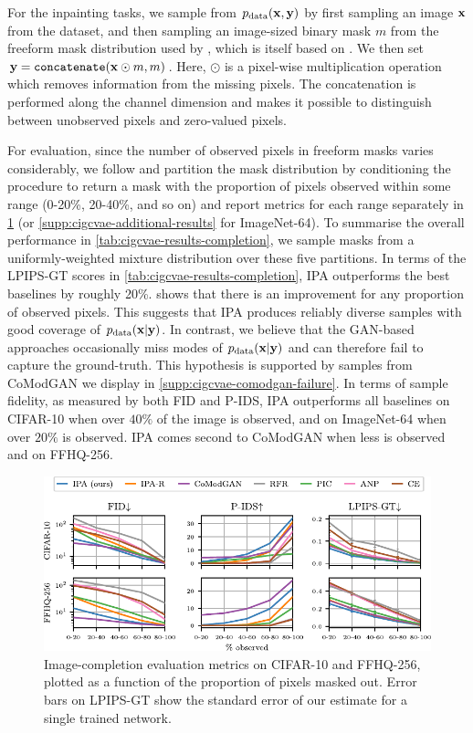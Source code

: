 For the inpainting tasks, we sample from $p_{\rm{data}}({\mathbf{x}}, {\mathbf{y}})$ by
first sampling an image ${\mathbf{x}}$ from the dataset, and then sampling an
image-sized binary mask $m$ from the freeform mask distribution used by
\citet{zhao2021large}, which is itself based on \citet{yu2018generative}. We
then set ${\mathbf{y}} = \texttt{concatenate}({\mathbf{x}} \odot m, m)$. Here, $\odot$ is a
pixel-wise multiplication operation which removes information from the missing
pixels. The concatenation is performed along the channel dimension and makes it
possible to distinguish between unobserved pixels and zero-valued pixels.

For evaluation, since the number of observed pixels in freeform masks varies
considerably, we follow \citet{zhao2021large} and partition the mask
distribution by conditioning the procedure to return a mask with the proportion
of pixels observed within some range (0-20\%, 20-40\%, and so on) and report
metrics for each range separately in \cref{fig:cigcvae-metrics} (or
\cref{supp:cigcvae-additional-results} for ImageNet-64). To summarise the
overall performance in \cref{tab:cigcvae-results-completion}, we sample masks from a
uniformly-weighted mixture distribution over these five partitions. In terms of
the LPIPS-GT scores in \cref{tab:cigcvae-results-completion}, IPA outperforms the best
baselines by roughly 20\%.  shows that there is an improvement
for any proportion of observed pixels. This suggests that IPA produces reliably
diverse samples with good coverage of $p_{\rm{data}}({\mathbf{x}}|{\mathbf{y}})$. In contrast, we
believe that the GAN-based approaches occasionally miss modes of
$p_{\rm{data}}({\mathbf{x}}|{\mathbf{y}})$ and can therefore fail to capture the ground-truth.
This hypothesis is supported by samples from CoModGAN we display in
\cref{supp:cigcvae-comodgan-failure}. In terms of sample fidelity, as measured by both
FID and P-IDS, IPA outperforms all baselines on CIFAR-10 when over $40\%$ of the
image is observed, and on ImageNet-64 when over $20\%$ is observed. IPA comes
second to CoModGAN when less is observed and on FFHQ-256.

\begin{figure}[t]
  \centering
  \includegraphics[width=\textwidth]{figs/cigcvae/metrics}
  \caption{Image-completion evaluation metrics on CIFAR-10 and FFHQ-256, plotted as a function of the proportion of pixels masked out. Error bars on LPIPS-GT show the standard error of our
    estimate for a single trained network.}
  \label{fig:cigcvae-metrics}
  \vspace{-.5cm}
\end{figure}


